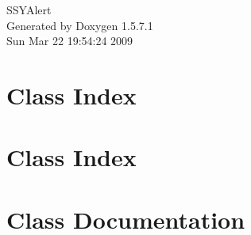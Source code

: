 \documentclass[a4paper]{book}
\begin{document}
\begin{titlepage}
\vspace*{7cm}
\begin{center}
{\Large SSYAlert }\\
\vspace*{1cm}
{\large Generated by Doxygen 1.5.7.1}\\
\vspace*{0.5cm}
{\small Sun Mar 22 19:54:24 2009}\\
\end{center}
\end{titlepage}
\clearemptydoublepage
{}
\tableofcontents
\clearemptydoublepage
{}
\chapter{Class Index}

\chapter{Class Index}

\chapter{Class Documentation}








\printindex
\end{document}
